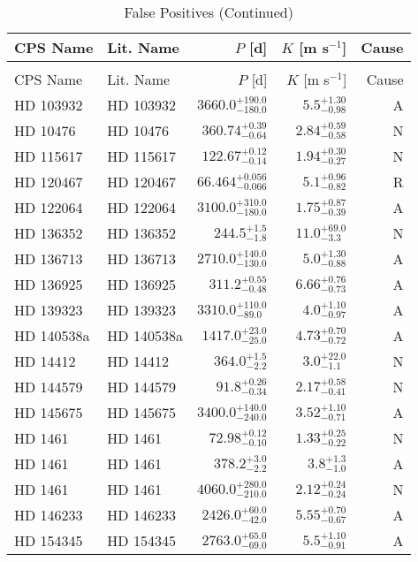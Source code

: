 \begin{longtable*}{llrrr}
\caption{False Positives} \\
\toprule 
\midrule 

CPS Name & Lit. Name & $P$ [d] & $K$ [m s$^{-1}$] & Cause \\ 
\endfirsthead 
\caption[]{False Positives (Continued)} \\
\toprule 
\midrule 
CPS Name & Lit. Name & $P$ [d] & $K$ [m s$^{-1}$] & Cause \\ 
\toprule 
\endhead 
HD 103932 & HD 103932 & $3660.0^{+190.0}_{-180.0}$ & $5.5^{+1.30}_{-0.98}$ & A \\ 
HD 10476 & HD 10476 & $360.74^{+0.39}_{-0.64}$ & $2.84^{+0.59}_{-0.58}$ & N \\ 
HD 115617 & HD 115617 & $122.67^{+0.12}_{-0.14}$ & $1.94^{+0.30}_{-0.27}$ & N \\ 
HD 120467 & HD 120467 & $66.464^{+0.056}_{-0.066}$ & $5.1^{+0.96}_{-0.82}$ & R \\ 
HD 122064 & HD 122064 & $3100.0^{+310.0}_{-180.0}$ & $1.75^{+0.87}_{-0.39}$ & A \\ 
HD 136352 & HD 136352 & $244.5^{+1.5}_{-1.8}$ & $11.0^{+69.0}_{-3.3}$ & N \\ 
HD 136713 & HD 136713 & $2710.0^{+140.0}_{-130.0}$ & $5.0^{+1.30}_{-0.88}$ & A \\ 
HD 136925 & HD 136925 & $311.2^{+0.55}_{-0.48}$ & $6.66^{+0.76}_{-0.73}$ & A \\ 
HD 139323 & HD 139323 & $3310.0^{+110.0}_{-89.0}$ & $4.0^{+1.10}_{-0.97}$ & A \\ 
HD 140538a & HD 140538a & $1417.0^{+23.0}_{-25.0}$ & $4.73^{+0.70}_{-0.72}$ & A \\ 
HD 14412 & HD 14412 & $364.0^{+1.5}_{-2.2}$ & $3.0^{+22.0}_{-1.1}$ & N \\ 
HD 144579 & HD 144579 & $91.8^{+0.26}_{-0.34}$ & $2.17^{+0.58}_{-0.41}$ & N \\ 
HD 145675 & HD 145675 & $3400.0^{+140.0}_{-240.0}$ & $3.52^{+1.10}_{-0.71}$ & A \\ 
HD 1461 & HD 1461 & $72.98^{+0.12}_{-0.10}$ & $1.33^{+0.25}_{-0.22}$ & N \\ 
HD 1461 & HD 1461 & $378.2^{+3.0}_{-2.2}$ & $3.8^{+1.3}_{-1.0}$ & A \\ 
HD 1461 & HD 1461 & $4060.0^{+280.0}_{-210.0}$ & $2.12^{+0.24}_{-0.24}$ & N \\ 
HD 146233 & HD 146233 & $2426.0^{+60.0}_{-42.0}$ & $5.55^{+0.70}_{-0.67}$ & A \\ 
HD 154345 & HD 154345 & $2763.0^{+65.0}_{-69.0}$ & $5.5^{+1.10}_{-0.91}$ & A \\ 

\end{longtable*}
